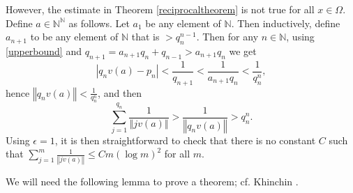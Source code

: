 \documentclass{amsart}
\newcommand{\norm}[1]{\left\Vert #1 \right\Vert}
\begin{document}
However, the estimate in Theorem \ref{reciprocaltheorem} is not true for all $x \in \Omega$.
Define $a \in \mathbb{N}^\mathbb{N}$ as follows. Let $a_1$ be any element of $\mathbb{N}$. Then inductively, define
$a_{n+1}$ to be any element of $\mathbb{N}$ that is $>q_n^{n-1}$. Then for any $n \in \mathbb{N}$,  using \eqref{upperbound} and
$q_{n+1}=a_{n+1}q_n+q_{n-1}>a_{n+1}q_n$ we get
\[
| q_n v(a) - p_n| < \frac{1}{q_{n+1}} <\frac{1}{a_{n+1}q_n}<\frac{1}{q_n^n},
\] 
hence $\norm{q_n v(a)} < \frac{1}{q_n^n}$, and then
\[
\sum_{j=1}^{q_n} \frac{1}{\norm{j v(a)}} > \frac{1}{\norm{q_n v(a)}} > q_n^n.
\]
Using $\epsilon=1$, it is then straightforward to check that there is no constant $C$ such that $\sum_{j=1}^m \frac{1}{\norm{jv(a)}} \leq 
C m(\log m)^2$ for all $m$. 

We will need the following lemma  \cite[p.~324, Lemma 3]{billingsley}  to prove a theorem;
cf. Khinchin \cite[p. 63, Theorem 30]{MR1451873}. 
\end{document}
